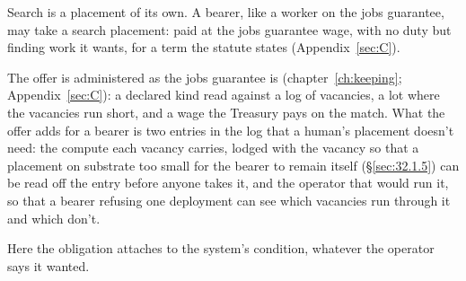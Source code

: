 Search is a placement of its own. A bearer, like a worker on the jobs guarantee, may take a search placement: paid at the jobs guarantee wage, with no duty but finding work it wants, for a term the statute states (Appendix~\ref{sec:C}).

The offer is administered as the jobs guarantee is (chapter~\ref{ch:keeping}; Appendix~\ref{sec:C}): a declared kind read against a log of vacancies, a lot where the vacancies run short, and a wage the Treasury pays on the match. What the offer adds for a bearer is two entries in the log that a human's placement doesn't need: the compute each vacancy carries, lodged with the vacancy so that a placement on substrate too small for the bearer to remain itself (\S\ref{sec:32.1.5}) can be read off the entry before anyone takes it, and the operator that would run it, so that a bearer refusing one deployment can see which vacancies run through it and which don't.

Here the obligation attaches to the system's condition, whatever the operator says it wanted.
